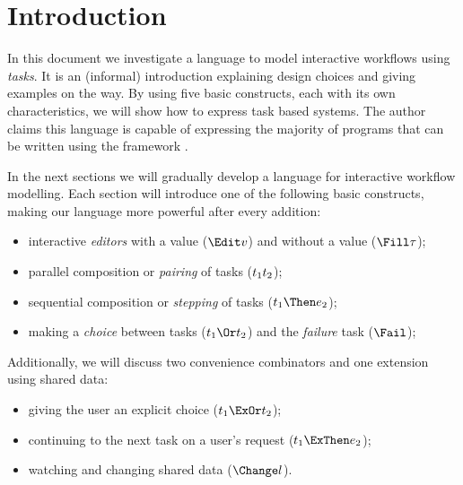 
\section{Introduction}

In this document we investigate a language to model interactive workflows using \emph{tasks}.
It is an (informal) introduction explaining design choices and giving examples on the way.
By using five basic constructs,
each with its own characteristics,
we will show how to express task based systems.
The author claims this language is capable of expressing the majority of programs that can be written using the \ITASKS framework \cite{conf/pepm/PlasmeijerAKLNG11}.

In the next sections we will gradually develop a language for interactive workflow modelling.
Each section will introduce one of the following basic constructs,
making our language more powerful after every addition:
\begin{itemize}
  \item interactive \emph{editors} with a value ($\Edit v$) and without a value ($\Fill \tau$);
  \item parallel composition or \emph{pairing} of tasks ($t_1 \relax t_2$);
  \item sequential composition or \emph{stepping} of tasks ($t_1 \Then e_2$);
  \item making a \emph{choice} between tasks ($t_1 \Or t_2$) and the \emph{failure} task ($\Fail$);
\end{itemize}
Additionally, we will discuss two convenience combinators and one extension using shared data:
\begin{itemize}
  \item giving the user an explicit choice ($t_1 \ExOr t_2$);
  \item continuing to the next task on a user's request ($t_1 \ExThen e_2$);
  \item watching and changing shared data ($\Change l$).
\end{itemize}

